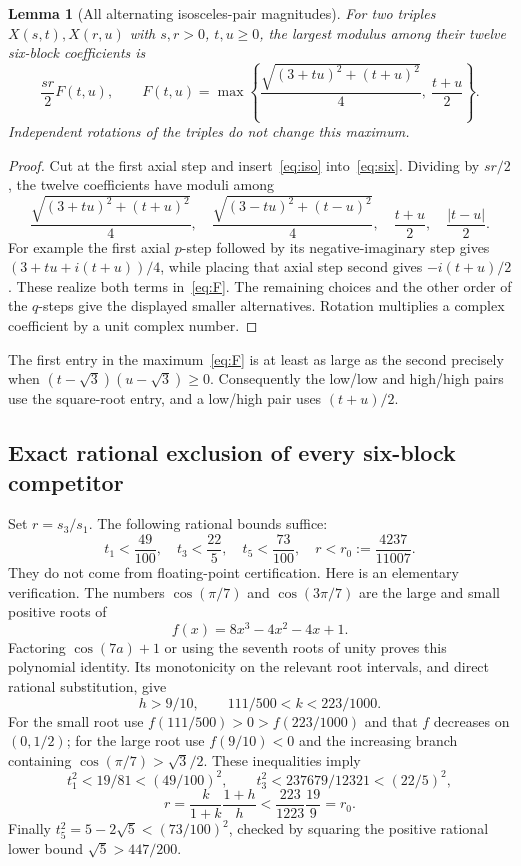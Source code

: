 \documentclass[11pt,a4paper]{article}
\newtheorem{lemma}[theorem]{Lemma}
\theoremstyle{definition}\newtheorem{definition}[theorem]{Definition}
\theoremstyle{remark}\newtheorem{remark}[theorem]{Remark}
\begin{document}
\begin{lemma}[All alternating isosceles-pair magnitudes]\label{lem:iso}
For two triples $X(s,t),X(r,u)$ with $s,r>0$, $t,u\ge0$, the largest modulus among their twelve six-block coefficients is
\begin{equation}\label{eq:F}
 \frac{sr}{2}F(t,u),\qquad
 F(t,u)=\max\left\{
 \frac{\sqrt{(3+tu)^2+(t+u)^2}}4,\ \frac{t+u}{2}\right\}.
\end{equation}
Independent rotations of the triples do not change this maximum.
\end{lemma}
\begin{proof}
Cut at the first axial step and insert~\eqref{eq:iso} into~\eqref{eq:six}. Dividing by $sr/2$, the twelve coefficients have moduli among
\[
 \frac{\sqrt{(3+tu)^2+(t+u)^2}}4,\quad
 \frac{\sqrt{(3-tu)^2+(t-u)^2}}4,\quad
 \frac{t+u}{2},\quad \frac{|t-u|}{2}.
\]
For example the first axial $p$-step followed by its negative-imaginary step gives $(3+tu+i(t+u))/4$, while placing that axial step second gives $-i(t+u)/2$. These realize both terms in~\eqref{eq:F}. The remaining choices and the other order of the $q$-steps give the displayed smaller alternatives. Rotation multiplies a complex coefficient by a unit complex number.
\end{proof}
The first entry in the maximum~\eqref{eq:F} is at least as large as the second precisely when $(t-\sqrt3)(u-\sqrt3)\ge0$. Consequently the low/low and high/high pairs use the square-root entry, and a low/high pair uses $(t+u)/2$.

\subsection{Exact rational exclusion of every six-block competitor}
Set $r=s_3/s_1$. The following rational bounds suffice:
\begin{equation}\label{eq:rational}
 t_1<\frac{49}{100},\quad t_3<\frac{22}{5},\quad
 t_5<\frac{73}{100},\quad r<r_0:=\frac{4237}{11007}.
\end{equation}
They do not come from floating-point certification. Here is an elementary verification. The numbers $\cos(\pi/7)$ and $\cos(3\pi/7)$ are the large and small positive roots of
\[
 f(x)=8x^3-4x^2-4x+1.
\]
Factoring $\cos(7a)+1$ or using the seventh roots of unity proves this polynomial identity. Its monotonicity on the relevant root intervals, and direct rational substitution, give
\[
 h>9/10,\qquad 111/500<k<223/1000.
\]
For the small root use $f(111/500)>0>f(223/1000)$ and that $f$ decreases on $(0,1/2)$; for the large root use $f(9/10)<0$ and the increasing branch containing $\cos(\pi/7)>\sqrt3/2$. These inequalities imply
\[
 t_1^2<19/81<(49/100)^2,
 \qquad t_3^2<237679/12321<(22/5)^2,
\]
\[
 r=\frac{k}{1+k}\frac{1+h}{h}
 <\frac{223}{1223}\frac{19}{9}=r_0.
\]
Finally $t_5^2=5-2\sqrt5<(73/100)^2$, checked by squaring the positive rational lower bound $\sqrt5>447/200$.
\end{document}
